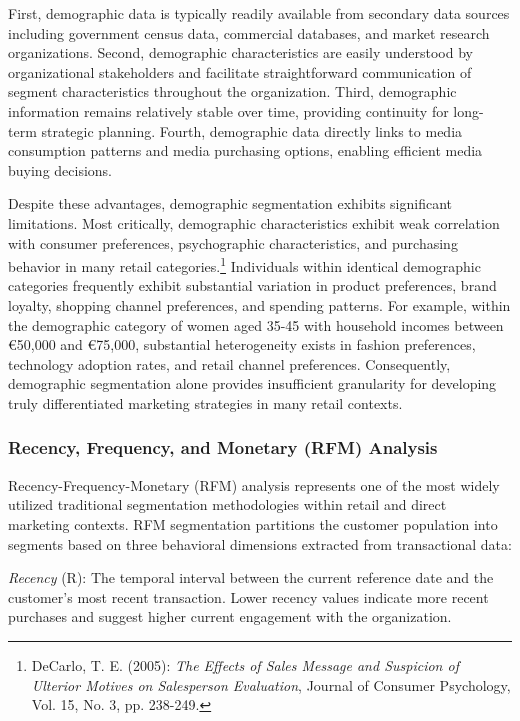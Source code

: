 \documentclass[12pt,a4paper,oneside]{report}
\begin{document}
First, demographic data is typically readily available from secondary data sources including government census data, commercial databases, and market research organizations. Second, demographic characteristics are easily understood by organizational stakeholders and facilitate straightforward communication of segment characteristics throughout the organization. Third, demographic information remains relatively stable over time, providing continuity for long-term strategic planning. Fourth, demographic data directly links to media consumption patterns and media purchasing options, enabling efficient media buying decisions.

Despite these advantages, demographic segmentation exhibits significant limitations. Most critically, demographic characteristics exhibit weak correlation with consumer preferences, psychographic characteristics, and purchasing behavior in many retail categories.\footnote{DeCarlo, T. E. (2005): \textit{The Effects of Sales Message and Suspicion of Ulterior Motives on Salesperson Evaluation}, Journal of Consumer Psychology, Vol. 15, No. 3, pp. 238-249.} Individuals within identical demographic categories frequently exhibit substantial variation in product preferences, brand loyalty, shopping channel preferences, and spending patterns. For example, within the demographic category of women aged 35-45 with household incomes between €50,000 and €75,000, substantial heterogeneity exists in fashion preferences, technology adoption rates, and retail channel preferences. Consequently, demographic segmentation alone provides insufficient granularity for developing truly differentiated marketing strategies in many retail contexts.

\subsubsection{Recency, Frequency, and Monetary (RFM) Analysis}

Recency-Frequency-Monetary (RFM) analysis represents one of the most widely utilized traditional segmentation methodologies within retail and direct marketing contexts. RFM segmentation partitions the customer population into segments based on three behavioral dimensions extracted from transactional data:

\textit{Recency} (R): The temporal interval between the current reference date and the customer's most recent transaction. Lower recency values indicate more recent purchases and suggest higher current engagement with the organization.
\end{document}
